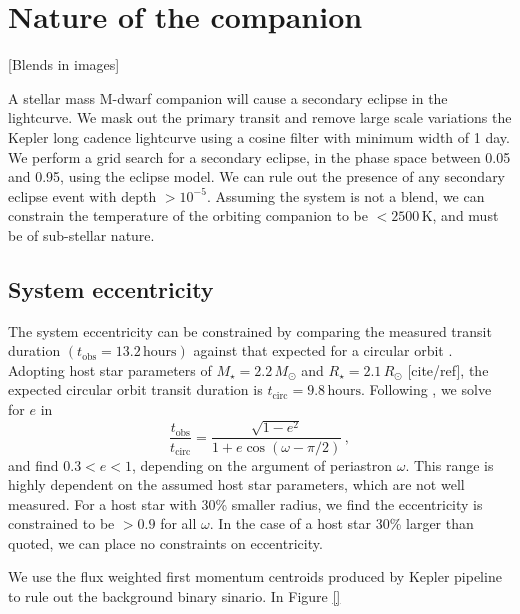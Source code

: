 \documentclass[preprint]{emulateapj}
\begin{document}
\section{Nature of the companion}
\label{sec:nature-companion}

[Blends in images]

A stellar mass M-dwarf companion will cause a secondary eclipse in the
lightcurve. We mask out the primary transit and remove large scale
variations the Kepler long cadence lightcurve using a cosine filter
with minimum width of 1 day. We perform a grid
search for a secondary eclipse, in the phase space between 0.05 and
0.95, using the \citet{Mandel2002} eclipse model. We can rule out the
presence of any secondary eclipse event with depth
$>10^{-5}$. Assuming the system is not a blend, we can constrain the
temperature of the orbiting companion to be $< 2500\,\text{K}$, and
must be of sub-stellar nature.

\subsection{System eccentricity}
\label{sec:system-eccentricity}

The system eccentricity can be constrained by comparing the measured
transit duration $(t_\text{obs}=13.2\,\text{hours})$ against that expected for a circular
orbit \citep[e.g.][]{Barnes2007,Burke2008,Kane2012}. Adopting host star
parameters of $M_\star = 2.2\,M_\odot$ and $R_\star = 2.1\,R_\odot$
[cite/ref], the expected circular orbit transit duration is
$t_\text{circ} =9.8\,\text{hours}$. Following \citet{Burke2008}, we
solve for $e$ in
\begin{equation}
  \label{eq:ecc}
  \frac{t_\text{obs}}{t_\text{circ}} = \frac{\sqrt{1-e^2}}{1+e \cos(\omega-\pi/2)}\,,
\end{equation}
and find $0.3 < e < 1$, depending on the argument of periastron $\omega$. This range is highly
dependent on the assumed host star parameters, which are not well
measured. For a host star with 30\% smaller radius, we find the
eccentricity is constrained to be $>0.9$ for all $\omega$. In the case
of a host star 30\% larger than quoted, we can place no constraints on
eccentricity. 


We use the flux weighted first momentum centroids produced by Kepler 
pipeline to rule out the background binary sinario. In Figure \ref{}  
\end{document}
